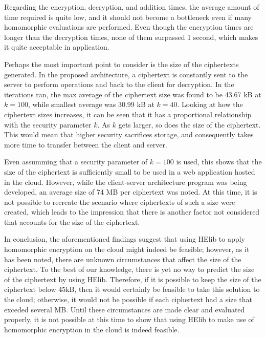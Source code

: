 Regarding the encryption, decryption, and addition times, the average amount of time required is quite low, and it should not become a bottleneck even if many homomorphic evaluations are performed. Even though the encryption times are longer than the decryption times, none of them surpassed 1 second, which makes it quite acceptable in application. 

Perhaps the most important point to consider is the size of the ciphertexts generated. In the proposed architecture, a ciphertext is constantly sent to the server to perform operations and back to the client for decryption. In the iterations ran, the max average of the ciphertext size was found to be 43.67 kB at $k=100$, while smallest average was 30.99 kB at $k=40$. Looking at how the ciphertext sizes increases, it can be seen that it has a proportional relationship with the security parameter $k$. As $k$ gets larger, so does the size of the ciphertext. This would mean that higher security sacrifices storage, and consequently takes more time to transfer between the client and server.

Even assumming that a security parameter of $k=100$ is used, this shows that the size of the ciphertext is sufficiently small to be used in a web application hosted in the cloud. However, while the client-server architecture program was being developed, an average size of 74 MB per ciphertext was noted. At this time, it is not possible to recreate the scenario where ciphertexts of such a size were created, which leads to the impression that there is another factor not considered that accounts for the size of the ciphertext.

In conclusion, the aforementioned findings suggest that using HElib to apply homomorphic encryption on the cloud might indeed be feasible; however, as it has been noted, there are unknown circumstances that affect the size of the ciphertext. To the best of our knowledge, there is yet no way to predict the size of the ciphertext by using HElib. Therefore, if it is possible to keep the size of the ciphertext below 45kB, then it would certainly be feasible to take this solution to the cloud; otherwise, it would not be possible if each ciphertext had a size that exceded several MB. Until these circumstances are made clear and evaluated properly, it is not possible at this time to show that using HElib to make use of homomorphic encryption in the cloud is indeed feasible. 


\clearpage
